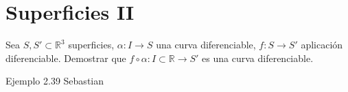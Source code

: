 \chapter{Superficies II}

\begin{ejr}[1]
  Sea $S, S' \subset \mathbb{R}^{3}$ superficies, $\alpha : I \to S$ una curva diferenciable, $f : S \to S'$ aplicación diferenciable. Demostrar que $f \circ \alpha : I \subset \mathbb{R} \to S'$ es una curva diferenciable.
\end{ejr}

\begin{sol}
  Ejemplo 2.39 Sebastian 
\end{sol}
